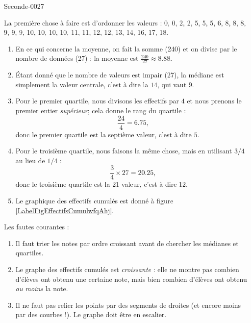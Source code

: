 
\begin{corrige}{Seconde-0027}

    La première chose à faire est d'ordonner les valeurs : 0, 0, 2, 2, 5, 5, 5, 6, 8, 8, 8, 9, 9, 9, 10, 10, 10, 10, 11, 11, 12, 12, 13, 14, 16, 17, 18.
    \begin{enumerate}
        \item
            En ce qui concerne la moyenne, on fait la somme (240) et on divise par le nombre de données (27) : la moyenne est \( \frac{ 240 }{ 27 }\approx 8.88\).
        \item
            Étant donné que le nombre de valeurs est impair (27), la médiane est simplement la valeur centrale, c'est à dire la \( 14\), qui vaut \( 9\).
        \item
            Pour le premier quartile, nous divisons les effectifs par \( 4\) et nous prenons le premier entier \emph{supérieur}; cela donne le rang du quartile :
            \begin{equation}
                \frac{ 24 }{ 4 }=6.75,
            \end{equation}
            donc le premier quartile est la septième valeur, c'est à dire \( 5\).
        \item
            Pour le troisième quartile, nous faisons la même chose, mais en utilisant \( 3/4\) au lieu de \( 1/4\) :
            \begin{equation}
                \frac{ 3 }{ 4 }\times 27=20.25,
            \end{equation}
            donc le troisième quartile est la \( 21\) valeur, c'est à dire \( 12\).
        \item
            Le graphique des effectifs cumulés est donné à figure \ref{LabelFigEffectifsCumulwfqAhj}.
            \newcommand{\CaptionFigEffectifsCumulwfqAhj}{Le graphique des effectifs cumulés de l'exercice \ref{exoSeconde-0027}.}


    \end{enumerate}

            Les fautes courantes :
            \begin{enumerate}
                \item
                    Il faut trier les notes par ordre croissant avant de chercher les médianes et quartiles.
                \item
                    Le graphe des effectifs cumulés est \emph{croissante} : elle ne montre pas combien d'élèves ont obtenu une certaine note, mais bien combien d'élèves ont obtenu \emph{au moins} la note.
                \item
                    Il ne faut pas relier les points par des segments de droites (et encore moins par des courbes !). Le graphe doit être en escalier.
            \end{enumerate}



\end{corrige}
